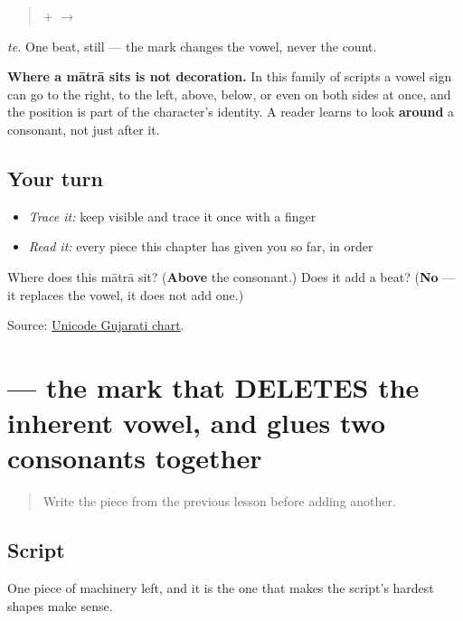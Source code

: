 \begin{quote}
\textbf{} + \textbf{} $\to$ \textbf{}
\end{quote}

\emph{te.} One beat, still — the mark changes the vowel, never the count.

\textbf{Where a mātrā sits is not decoration.} In this family of scripts a vowel sign can go to the right, to the left, above, below, or even on both sides at once, and the position is part of the character's identity. A reader learns to look \textbf{around} a consonant, not just after it.

\subsection*{Your turn}
\begin{itemize}
\raggedright
  \item \emph{Trace it:} keep  visible and trace it once with a finger
  \item \emph{Read it:} every piece this chapter has given you so far, in order
\end{itemize}

\begin{tcolorbox}[breakable,colback=teal!4,colframe=teal!35!black,title={Before you move on}]
Where does this mātrā sit? (\textbf{Above} the consonant.) Does it add a beat? (\textbf{No} — it replaces the vowel, it does not add one.)

Source: \href{https://www.unicode.org/charts/PDF/U0A80.pdf}{Unicode Gujarati chart}.
\end{tcolorbox}
\section[\texorpdfstring{\gu{્} ((virama))}{્ ((virama))}]{ — the mark that DELETES the inherent vowel, and glues two consonants together}

\label{lesson:GU-W01-virama}



\begin{quote}
Write the piece from the previous lesson before adding another.
\end{quote}

\subsection*{Script}
One piece of machinery left, and it is the one that makes the script's hardest shapes make sense.

